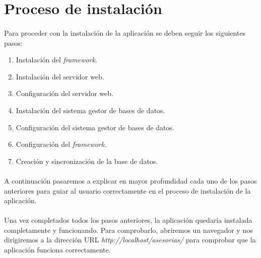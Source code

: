 \section{Proceso de instalación}\label{instalacion}

  \paragraph{}Para proceder con la instalación de la aplicación se deben seguir
  los siguientes pasos:

  \begin{enumerate}
   \item Instalación del \textit{framework}.
   \item Instalación del servidor web.
   \item Configuración del servidor web.
   \item Instalación del sistema gestor de bases de datos.
   \item Configuración del sistema gestor de bases de datos.
   \item Configuración del \textit{framework}.
   \item Creación y sincronización de la base de datos.
  \end{enumerate}

  \paragraph{}A continuación pasaremos a explicar en mayor profundidad cada
  uno de los pasos anteriores para guiar al usuario correctamente en el proceso
  de instalación de la aplicación.

  \begin{enumerate}
    
    
    
    
    
    
    
  \end{enumerate}

  \paragraph{}Una vez completados todos los pasos anteriores, la aplicación
  quedaría instalada completamente y funcionando. Para comprobarlo, abriremos
  un navegador y nos dirigiremos a la dirección URL
  \textit{http://localhost/asesorias/} para comprobar que la aplicación funciona
  correctamente.